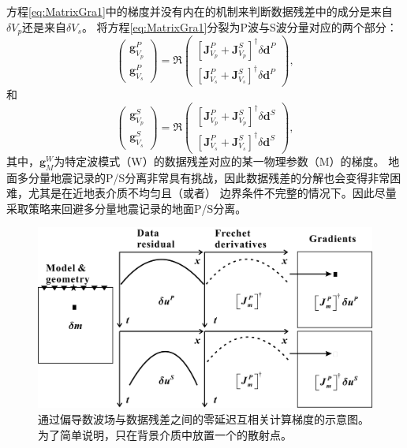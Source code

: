 方程\eqref{eq:MatrixGra1}中的梯度并没有内在的机制来判断数据残差中的成分是来自$\delta V_p$还是来自$\delta V_s$。
将方程\eqref{eq:MatrixGra1}分裂为P波与S波分量对应的两个部分：
\begin{equation}
        \begin{pmatrix}
                \mathbf{g}^P_{V_p}\\
                \mathbf{g}^P_{V_s}
        \end{pmatrix}
        =\mathfrak{R}\begin{pmatrix}
                [\mathbf{J}^P_{V_p}+\mathbf{J}^S_{V_p}]^{\dagger}\delta \mathbf{d}^P\\
                [\mathbf{J}^P_{V_s}+\mathbf{J}^S_{V_s}]^{\dagger}\delta \mathbf{d}^P
        \end{pmatrix},
        \label{eq:DEMatrixGraP}
\end{equation}
和
\begin{equation}
        \begin{pmatrix}
                \mathbf{g}^S_{V_p}\\
                \mathbf{g}^S_{V_s}
        \end{pmatrix}
        =\mathfrak{R}\begin{pmatrix}
                [\mathbf{J}^P_{V_p}+\mathbf{J}^S_{V_p}]^{\dagger}\delta \mathbf{d}^S\\
                [\mathbf{J}^P_{V_s}+\mathbf{J}^S_{V_s}]^{\dagger}\delta \mathbf{d}^S
        \end{pmatrix},
        \label{eq:DEMatrixGraS}
\end{equation}
其中，$\mathbf{g}^W_M$为特定波模式（W）的数据残差对应的某一物理参数（M）的梯度。
地面多分量地震记录的P/S分离非常具有挑战，因此数据残差的分解也会变得非常困难，尤其是在近地表介质不均匀且（或者）
边界条件不完整的情况下。因此尽量采取策略来回避多分量地震记录的地面P/S分离。
\begin{figure}
    \begin{center}
        \includegraphics[width=1.0\textwidth]{Figure/chapter02/finalMarmousiII/Fig/zerolagLAST1.pdf}
        \caption{
			通过偏导数波场与数据残差之间的零延迟互相关计算梯度的示意图。为了简单说明，只在背景介质中放置一个的散射点。
    }
    \label{fig:crossterm}
    \end{center}
\end{figure}

